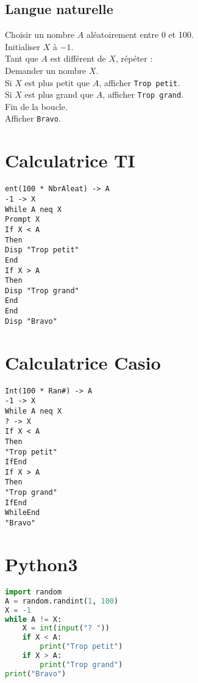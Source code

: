 \documentclass[12pt]{article}
\begin{document}
\begin{multicols}{2}
  \begin{minipage}{\textwidth}
\subsection*{Langue naturelle}

Choisir un nombre $A$ aléatoirement entre 0 et 100.\\
Initialiser $X$ à $-1$.\\
Tant que $A$ est différent de $X$, répéter :\\
Demander un nombre $X$.\\
Si $X$ est plus petit que $A$, afficher \verb+Trop petit+.\\
Si $X$ est plus grand que $A$, afficher \verb+Trop grand+.\\
Fin de la boucle.\\
Afficher \verb+Bravo+.
\end{minipage}

\columnbreak

  \section*{Calculatrice TI}
\begin{lstlisting}[language=TI,frame=single]
ent(100 * NbrAleat) -> A
-1 -> X
While A neq X
Prompt X
If X < A
Then
Disp "Trop petit"
End
If X > A
Then
Disp "Trop grand"
End
End
Disp "Bravo"
\end{lstlisting}
\end{multicols}

\begin{multicols}{2}
\section*{Calculatrice Casio}
\begin{lstlisting}[language=casio,frame=single]
Int(100 * Ran#) -> A
-1 -> X
While A neq X
? -> X
If X < A
Then
"Trop petit"
IfEnd
If X > A
Then
"Trop grand"
IfEnd
WhileEnd
"Bravo"
\end{lstlisting}

\columnbreak

\section*{Python3}
\begin{lstlisting}[language=python,frame=single]
import random
A = random.randint(1, 100)
X = -1
while A != X:
    X = int(input("? "))
    if X < A:
        print("Trop petit")
    if X > A:
        print("Trop grand")
print("Bravo")
\end{lstlisting}
\end{multicols}
\end{document}

